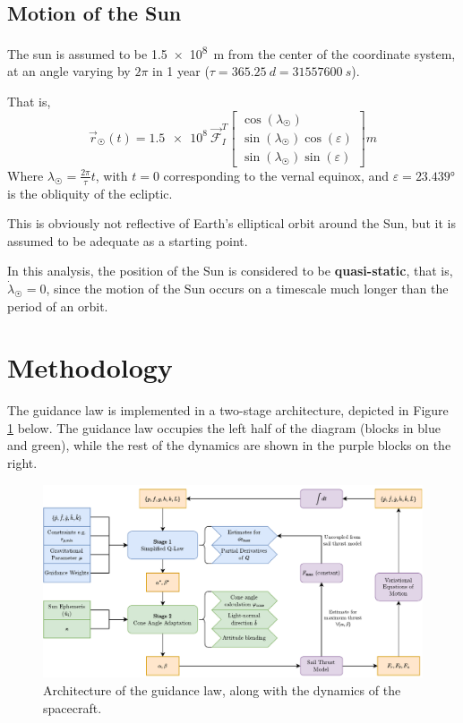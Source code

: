 \subsection{Motion of the Sun}
The sun is assumed to be \qty{1.5e8}{m} from the center of the coordinate system, at an angle varying by \(2\pi\) in 1 year (\(\tau = \qty{365.25}{d} = \qty{31557600}{s}\)).

That is,
\begin{equation}
  \vec{r}_{\astrosun}(t) =
  \num{1.5e8}
  \
  \mathcal{\vec{F}}_I^T
  \begin{bmatrix}
    \cos(\lambda_{\astrosun})                   \\
    \sin(\lambda_{\astrosun}) \cos(\varepsilon) \\
    \sin(\lambda_{\astrosun}) \sin(\varepsilon)
  \end{bmatrix}
  \unit{m}
  \label{eq:sun_position_3d}
\end{equation}
Where \(\lambda_{\astrosun} = \frac{2 \pi}{\tau} t\), with \(t=0\) corresponding to the vernal equinox, and \(\varepsilon = \ang{23.439}\) is the obliquity of the ecliptic.

This is obviously not reflective of Earth's elliptical orbit around the Sun, but it is assumed to be adequate as a starting point.

In this analysis, the position of the Sun is considered to be \textbf{quasi-static}, that is, \(\dot{\lambda}_{\astrosun} = 0\), since the motion of the Sun occurs on a timescale much longer than the period of an orbit.

\section{Methodology}
The guidance law is implemented in a
two-stage architecture, depicted in Figure \ref{fig:algorithm_diagram} below. The guidance law occupies the left half of the diagram (blocks in blue and green), while the rest of the dynamics are shown in the purple blocks on the right.

\begin{figure}[H]
  \centering
  \includegraphics[width=\textwidth]{figures/compute_topology.drawio.pdf}
  \caption{Architecture of the guidance law, along with the dynamics of the spacecraft.}
  \label{fig:algorithm_diagram}
\end{figure}

